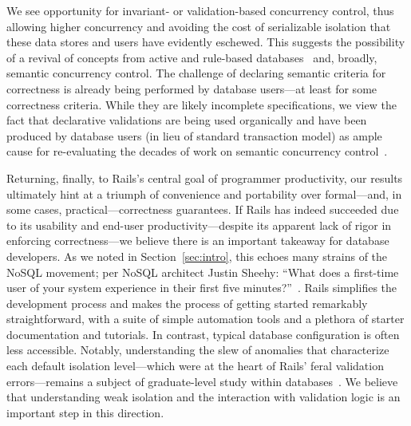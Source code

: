 We see opportunity for invariant- or validation-based concurrency
control, thus allowing higher concurrency and avoiding the cost of
serializable isolation that these data stores and users have evidently
eschewed. This suggests the possibility of a revival of concepts from
active and rule-based databases~\cite{activedb-book} and, broadly,
semantic concurrency control. The challenge of declaring semantic
criteria for correctness is already being performed by database
users---at least for some correctness criteria. While they are likely
incomplete specifications, we view the fact that declarative
validations are being used organically and have been produced by
database users (in lieu of standard transaction model) as ample cause
for re-evaluating the decades of work on semantic concurrency control~\cite{tamer-book}.

 Returning, finally, to Rails's central
goal of programmer productivity, our results ultimately hint at a
triumph of convenience and portability over formal---and, in some
cases, practical---correctness guarantees. If Rails has indeed
succeeded due to its usability and end-user productivity---despite its
apparent lack of rigor in enforcing correctness---we believe there is
an important takeaway for database developers. As we noted in
Section~\ref{sec:intro}, this echoes many strains of the NoSQL
movement; per NoSQL architect Justin Sheehy: ``What does a
first-time user of your system experience in their first five
minutes?''~\cite{marcus-talk}. Rails simplifies the development
process and makes the process of getting started remarkably
straightforward, with a suite of simple automation tools and a
plethora of starter documentation and tutorials. In contrast, typical
database configuration is often less accessible. Notably,
understanding the slew of anomalies that characterize each default
isolation level---which were at the heart of Rails' feral validation
errors---remains a subject of graduate-level study within
databases~\cite{adya-isolation,hat-vldb}. We believe that
understanding weak isolation and the interaction with validation logic
is an important step in this direction.




